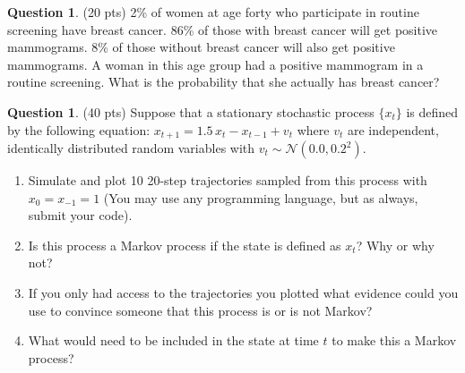 \documentclass{article}
\theoremstyle{definition}
\newtheorem{question}[thm]{Question}
\begin{document}

\begin{question} (20 pts)
    2\% of women at age forty who participate in routine screening have breast cancer. 86\% of those with breast cancer will get positive mammograms. 8\% of those without breast cancer will also get positive mammograms. A woman in this age group had a positive mammogram in a routine screening. What is the probability that she actually has breast cancer?
\end{question}

\begin{question} (40 pts)
Suppose that a stationary stochastic process $\{x_t\}$ is defined by the following equation: $x_{t+1} = 1.5 \, x_t - x_{t-1} + v_{t}$ where $v_t$ are independent, identically distributed random variables with $v_t \sim \mathcal{N}(0.0, 0.2^2)$.
    \begin{enumerate}[nosep,label=(\alph*)]
        \item Simulate and plot 10 20-step trajectories sampled from this process with $x_0 = x_{-1} = 1$ (You may use any programming language, but as always, submit your code).
        \item Is this process a Markov process if the state is defined as $x_t$? Why or why not?
        \item If you only had access to the trajectories you plotted what evidence could you use to convince someone that this process is or is not Markov?
        \item What would need to be included in the state at time $t$ to make this a Markov process?
    \end{enumerate}
\end{question}
\end{document}

